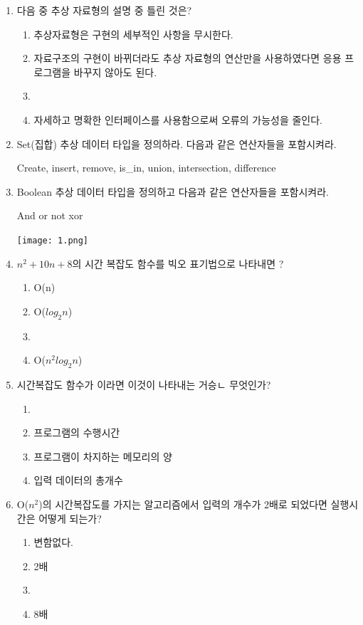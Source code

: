 \documentclass[11pt,a4paper]{article}
\begin{document}
\noindent
\begin{enumerate}
	

\item { 다음 중 추상 자료형의 설명 중 틀린 것은?}
	\begin{enumerate}
	\item 추상자료형은 구현의 세부적인 사항을 무시한다.
	\item 자료구조의 구현이 바뀌더라도 추상 자료형의 연산만을 사용하였다면 응용 프로그램을 바꾸지 않아도 된다.
	\item {}
	\item 자세하고 명확한 인터페이스를 사용함으로써 오류의 가능성을 줄인다.
	\end{enumerate}
	
\item Set(집합) 추상 데이터 타입을 정의하라. 다음과 같은 연산자들을 포함시켜라.

{\ttfamily Create, insert, remove, is\_in, union, intersection, difference}

\item Boolean 추상 데이터 타입을 정의하고 다음과 같은 연산자들을 포함시켜라.

And or not xor

\lstset{language=C++, tabsize=4, frame=single, showstringspaces=false, breaklines=true, columns=flexible, basicstyle=\ttfamily\small}
	
\texttt{[image: 1.png]}
	
	
\item $n^2+10n+8$의 시간 복잡도 함수를 빅오 표기법으로 나타내면 ?
	\begin{enumerate}
		\item O(n)	
		\item O($log_2 n$)
		\item {}
		\item O($n^2log_2n$)
	\end{enumerate}
	
\item 시간복잡도 함수가 이라면 이것이 나타내는 거승ㄴ 무엇인가?
	\begin{enumerate}
		\item {}
		\item 프로그램의 수행시간
		\item 프로그램이 차지하는 메모리의 양
		\item 입력 데이터의 총개수
	\end{enumerate}
\item O($n^2$)의 시간복잡도를 가지는 알고리즘에서 입력의 개수가 2배로 되었다면 실행시간은 어떻게 되는가?
\begin{enumerate}
	\item 변함없다.
	\item 2배
	\item {}
	\item 8배
\end{enumerate}


\end{enumerate}
\end{document}
